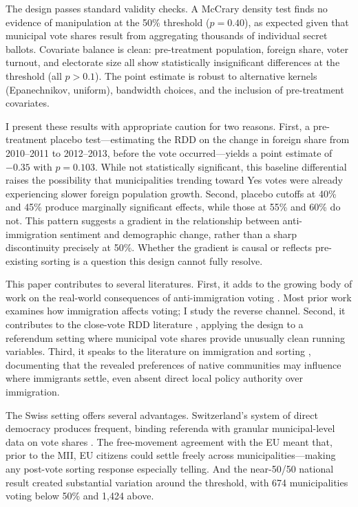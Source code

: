 \documentclass[12pt]{article}
\begin{document}
The design passes standard validity checks. A McCrary density test finds no evidence of manipulation at the 50\% threshold ($p = 0.40$), as expected given that municipal vote shares result from aggregating thousands of individual secret ballots. Covariate balance is clean: pre-treatment population, foreign share, voter turnout, and electorate size all show statistically insignificant differences at the threshold (all $p > 0.1$). The point estimate is robust to alternative kernels (Epanechnikov, uniform), bandwidth choices, and the inclusion of pre-treatment covariates.

I present these results with appropriate caution for two reasons. First, a pre-treatment placebo test---estimating the RDD on the change in foreign share from 2010--2011 to 2012--2013, before the vote occurred---yields a point estimate of $-0.35$ with $p = 0.103$. While not statistically significant, this baseline differential raises the possibility that municipalities trending toward Yes votes were already experiencing slower foreign population growth. Second, placebo cutoffs at 40\% and 45\% produce marginally significant effects, while those at 55\% and 60\% do not. This pattern suggests a gradient in the relationship between anti-immigration sentiment and demographic change, rather than a sharp discontinuity precisely at 50\%. Whether the gradient is causal or reflects pre-existing sorting is a question this design cannot fully resolve.

This paper contributes to several literatures. First, it adds to the growing body of work on the real-world consequences of anti-immigration voting \citep{hangartner2019, barone2016, halla2017, steinmayr2021, tabellini2020}. Most prior work examines how immigration affects voting; I study the reverse channel. Second, it contributes to the close-vote RDD literature \citep{lee2008, lee2010}, applying the design to a referendum setting where municipal vote shares provide unusually clean running variables. Third, it speaks to the literature on immigration and sorting \citep{card2001, amuedo2021}, documenting that the revealed preferences of native communities may influence where immigrants settle, even absent direct local policy authority over immigration.

The Swiss setting offers several advantages. Switzerland's system of direct democracy produces frequent, binding referenda with granular municipal-level data on vote shares \citep{helbling2014}. The free-movement agreement with the EU meant that, prior to the MII, EU citizens could settle freely across municipalities---making any post-vote sorting response especially telling. And the near-50/50 national result created substantial variation around the threshold, with 674 municipalities voting below 50\% and 1,424 above.
\end{document}
